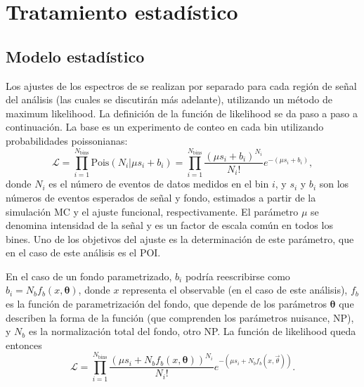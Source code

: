\section{Tratamiento estad\'istico}
\label{sec:strategy:stat_treatment}






\subsection{Modelo estad\'istico}
\label{subsec:strategy:stat_treatment:stat_model}

Los ajustes de los espectros de \myj se realizan por separado para cada región de señal del análisis (las cuales se discutir\'an m\'as adelante), utilizando un método de maximum likelihood. La definición de la función de likelihood se da paso a paso a continuación. La base es un experimento de conteo en cada bin utilizando probabilidades poissonianas:
\begin{equation}
    \mathcal{L} = 
    \prod_{i=1}^{N_{\text{bins}}} \text{Pois}\left(N_i | \mu s_i + b_i\right) = 
    \prod_{i=1}^{N_{\text{bins}}} \frac{\left( \mu s_i + b_i \right)^{N_i}}{N_i !} e^{-\left( \mu s_i + b_i \right)},
\end{equation}
donde \(N_i\) es el número de eventos de datos medidos en el bin \(i\), y \(s_i\) y \(b_i\) son los n\'umeros de eventos esperados de señal y fondo, estimados a partir de la simulación \ac{MC} y el ajuste funcional, respectivamente. El parámetro \(\mu\) se denomina intensidad de la señal y es un factor de escala común en todos los bines. Uno de los objetivos del ajuste es la determinación de este parámetro, que en el caso de este an\'alisis es el \ac{POI}.

En el caso de un fondo parametrizado, \(b_i\) podría reescribirse como \(b_i = N_b f_b\left(x, \mathbf{\theta}\right)\), donde \(x\) representa el observable (\myj en el caso de este análisis), \(f_b\) es la función de parametrización del fondo, que depende de los parámetros \(\mathbf{\theta}\) que describen la forma de la función (que comprenden los par\'ametros nuisance, \acs{NP}), y \(N_b\) es la normalización total del fondo, otro \ac{NP}. La función de likelihood queda entonces
\begin{equation}
    \label{eq:strategy:stat_treatment:stat_model:likelihood}
    \mathcal{L} = 
    \prod_{i=1}^{N_{\text{bins}}} \frac{\left( \mu s_i + N_b f_b \left(x, \mathbf{\theta}\right) \right)^{N_i}}{N_i !} e^{-\left( \mu s_i + N_b f_b \left(x, \vec{\theta}\right) \right)}.
\end{equation}

